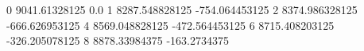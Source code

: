 0 9041.61328125 0.0
1 8287.548828125 -754.064453125
2 8374.986328125 -666.626953125
4 8569.048828125 -472.564453125
6 8715.408203125 -326.205078125
8 8878.33984375 -163.2734375
